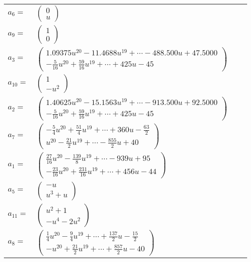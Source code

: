 \documentclass[1p]{elsarticle_modified}
\theoremstyle{definition}
\begin{document}
\begin{tabular}{m{7pt} m{180pt} m{7pt} m{180pt} }
\flushright $a_{6}=$&$\begin{pmatrix}0\\u\end{pmatrix}$ \\
\flushright $a_{9}=$&$\begin{pmatrix}1\\0\end{pmatrix}$ \\
\flushright $a_{3}=$&$\begin{pmatrix}1.09375 u^{20}-11.4688 u^{19}+\cdots-488.500 u+47.5000\\-\frac{5}{16} u^{20}+\frac{59}{16} u^{19}+\cdots+425 u-45\end{pmatrix}$ \\
\flushright $a_{10}=$&$\begin{pmatrix}1\\- u^2\end{pmatrix}$ \\
\flushright $a_{2}=$&$\begin{pmatrix}1.40625 u^{20}-15.1563 u^{19}+\cdots-913.500 u+92.5000\\-\frac{5}{16} u^{20}+\frac{59}{16} u^{19}+\cdots+425 u-45\end{pmatrix}$ \\
\flushright $a_{7}=$&$\begin{pmatrix}-\frac{5}{4} u^{20}+\frac{51}{4} u^{19}+\cdots+360 u-\frac{63}{2}\\u^{20}-\frac{21}{2} u^{19}+\cdots-\frac{855}{2} u+40\end{pmatrix}$ \\
\flushright $a_{1}=$&$\begin{pmatrix}\frac{27}{16} u^{20}-\frac{139}{8} u^{19}+\cdots-939 u+95\\-\frac{23}{16} u^{20}+\frac{231}{16} u^{19}+\cdots+456 u-44\end{pmatrix}$ \\
\flushright $a_{5}=$&$\begin{pmatrix}- u\\u^3+u\end{pmatrix}$ \\
\flushright $a_{11}=$&$\begin{pmatrix}u^2+1\\- u^4-2 u^2\end{pmatrix}$ \\
\flushright $a_{8}=$&$\begin{pmatrix}\frac{1}{4} u^{20}-\frac{9}{4} u^{19}+\cdots+\frac{137}{2} u-\frac{15}{2}\\- u^{20}+\frac{21}{2} u^{19}+\cdots+\frac{857}{2} u-40\end{pmatrix}$ \\

\end{tabular}
\end{document}
